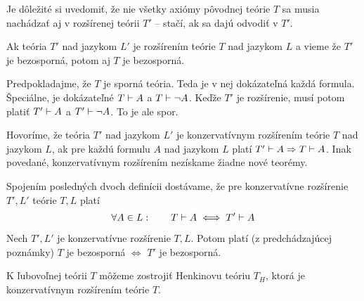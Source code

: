 \begin{poznamka}
    Je dôležité si uvedomiť, že nie všetky axiómy pôvodnej teórie $T$
    sa musia nachádzať aj v rozšírenej teórii $T'$ -- 
    stačí, ak sa dajú odvodiť v $T'$.
\end{poznamka}

\begin{poznamka}
 Ak teória $T'$ nad jazykom $L'$ je rozšírením teórie $T$ nad jazykom
 $L$ a vieme že $T'$ je bezosporná, potom aj $T$ je bezosporná.
\end{poznamka}
\begin{dokaz}
    Predpokladajme, že $T$ je sporná teória. Teda je v nej dokázateľná
    každá formula.
    Špeciálne, je dokázateľné $T \vdash A$ a $T \vdash \neg A$.
    Keďže $T'$ je rozšírenie, musí potom platiť
    $T' \vdash A$ a $T' \vdash \neg A$. To je ale spor.
    \\
\end{dokaz}

\begin{definicia}
    Hovoríme, že teória $T'$ nad jazykom $L'$ je konzervatívnym
    rozšírením teórie $T$ nad jazykom $L$, ak pre každú formulu
    $A$ nad jazykom $L$ platí $T' \vdash A \Rightarrow T \vdash A$.
    Inak povedané, konzervatívnym rozšírením nezískame žiadne nové 
    teorémy.
\end{definicia}

\begin{poznamka}
    Spojením posledných dvoch definícii dostávame, že pre
    konzervatívne rozšírenie $T',L'$ teórie $T,L$ platí
    \begin{equation*}
        \forall A \in L:\quad\quad T \vdash A \iff T' \vdash A
    \end{equation*}
\end{poznamka}

\begin{poznamka}
    Nech $T',L'$ je konzervatívne rozšírenie $T,L$. Potom platí (z
    predchádzajúcej poznámky)
    $T$ je bezosporná $\iff$ $T'$ je bezosporná.
\end{poznamka}

\begin{veta}[Henkinova] 
    K ľubovoľnej teórii $T$ môžeme zostrojiť Henkinovu
    teóriu $T_H$, ktorá je konzervatívnym rozšírením teórie $T$.
\end{veta}    

